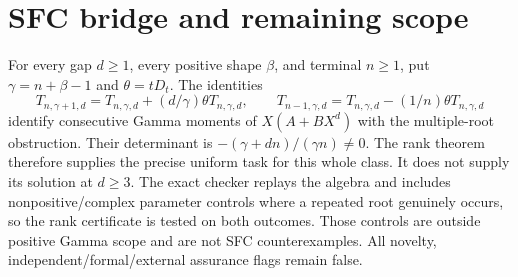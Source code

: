 \documentclass[11pt]{article}
\begin{document}
\section{SFC bridge and remaining scope}
For every gap $d\ge1$, every positive shape $\beta$, and terminal
$n\ge1$, put $\gamma=n+\beta-1$ and $\theta=tD_t$. The identities
\[
 T_{n,\gamma+1,d}=T_{n,\gamma,d}+(d/\gamma)\theta T_{n,\gamma,d},
 \qquad T_{n-1,\gamma,d}=T_{n,\gamma,d}-(1/n)\theta T_{n,\gamma,d}
\]
identify consecutive Gamma moments of $X(A+BX^d)$ with the
multiple-root obstruction. Their determinant is
$-(\gamma+dn)/(\gamma n)\ne0$.
The rank theorem therefore supplies the precise uniform task for this
whole class. It does not supply its solution at $d\ge3$.
The exact checker replays the algebra and includes nonpositive/complex
parameter controls where a repeated root genuinely occurs, so the rank
certificate is tested on both outcomes. Those controls are outside
positive Gamma scope and are not SFC counterexamples.
All novelty, independent/formal/external assurance flags remain false.
\end{document}
